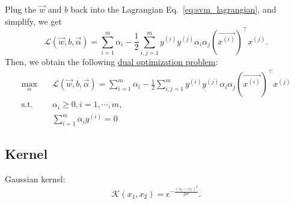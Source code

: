 \documentclass[10pt,onecolumn]{book}
\begin{document}
Plug the $\vec{w}$ and $b$ back into the Lagrangian Eq.~\ref{eq:svm_lagrangian}, and simplify, we get
\begin{equation}
\mathcal{L}(\vec{w}, b, \vec{\alpha}) = \sum_{i = 1}^m \alpha_i - \frac{1}{2} \sum_{i,j=1}^m y^{(i)} y^{(j)} \alpha_i \alpha_j(\overrightarrow{x^{(i)}})^\top x^{(j)}.
\end{equation}
Then, we obtain the following \uline{dual optimization problem}:
\begin{equation}
\begin{split}
\max_\alpha & \quad \mathcal{L}(\vec{w}, b, \vec{\alpha}) = \sum_{i = 1}^m \alpha_i - \frac{1}{2} \sum_{i,j=1}^m y^{(i)} y^{(j)} \alpha_i \alpha_j(\overrightarrow{x^{(i)}})^\top x^{(j)} \\
\text{s.t.} & \quad \alpha_i \geq 0, i=1,\cdots, m, \\
& \quad \sum_{i=1}^m \alpha_i y^{(i)} = 0
\end{split}
\end{equation}


\subsection{Kernel}
Gaussian kernel:
\begin{equation}
\mathcal{K}(x_1, x_2) = e^{-\frac{(x_1 - x_2)^2}{2 \sigma^2}}.
\end{equation}
\end{document}
